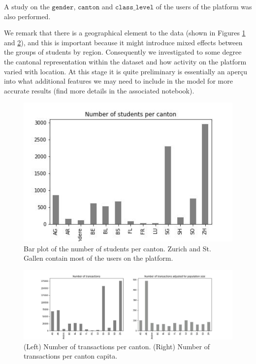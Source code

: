 \documentclass[sigplan,screen]{acmart}
\begin{document}
A study on the $\texttt{gender}$, $\texttt{canton}$ and $\texttt{class\_level}$ of the users of the platform was also performed.

We remark that there is a geographical element to the data (shown in Figures \ref{fig:my_label} and \ref{fig:cantonal_representation}), and this is important because it might introduce mixed effects between the groups of students by region. Consequently we investigated to some degree the cantonal representation within the dataset and how activity on the platform varied with location. At this stage it is quite preliminary is essentially an aperçu into what additional features we may need to include in the model for more accurate results (find more details in the associated notebook).

\begin{figure}
    \centering
    \includegraphics[width=\linewidth]{reports/figures/num_per_canton.jpg}
    \caption{Bar plot of the number of students per canton. Zurich and St. Gallen contain most of the users on the platform.}
    \label{fig:my_label}
\end{figure}

\begin{figure}[!ht]
    \centering
    \includegraphics[width=\linewidth]{reports/figures/cantonal_representation.jpg}
    \caption{(Left) Number of transactions per canton. (Right) Number of transactions per canton capita.}
    \label{fig:cantonal_representation}
\end{figure}
\end{document}
